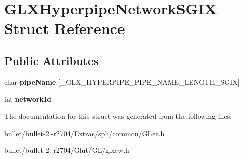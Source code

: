 \hypertarget{struct_g_l_x_hyperpipe_network_s_g_i_x}{\section{G\+L\+X\+Hyperpipe\+Network\+S\+G\+I\+X Struct Reference}
\label{struct_g_l_x_hyperpipe_network_s_g_i_x}
}
\subsection*{Public Attributes}
\begin{DoxyCompactItemize}
\item 
\hypertarget{struct_g_l_x_hyperpipe_network_s_g_i_x_a773c9de10acded8d034688daef1b1e5a}{char {\bfseries pipe\+Name} \mbox{[}\+\_\+\+G\+L\+X\+\_\+\+H\+Y\+P\+E\+R\+P\+I\+P\+E\+\_\+\+P\+I\+P\+E\+\_\+\+N\+A\+M\+E\+\_\+\+L\+E\+N\+G\+T\+H\+\_\+\+S\+G\+I\+X\mbox{]}}\label{struct_g_l_x_hyperpipe_network_s_g_i_x_a773c9de10acded8d034688daef1b1e5a}

\item 
\hypertarget{struct_g_l_x_hyperpipe_network_s_g_i_x_a81393053988b32fadb0b21615024add1}{int {\bfseries network\+Id}}\label{struct_g_l_x_hyperpipe_network_s_g_i_x_a81393053988b32fadb0b21615024add1}

\end{DoxyCompactItemize}


The documentation for this struct was generated from the following files\+:\begin{DoxyCompactItemize}
\item 
bullet/bullet-\/2.-\/r2704/\+Extras/sph/common/G\+Lee.\+h\item 
bullet/bullet-\/2.-\/r2704/\+Glut/\+G\+L/glxew.\+h\end{DoxyCompactItemize}
